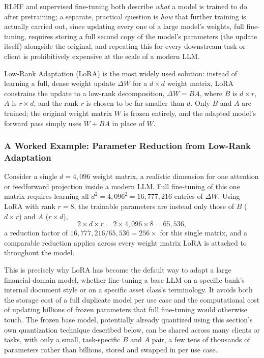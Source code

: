 \documentclass[../ai_in_finance]{subfiles}
\begin{document}
RLHF and supervised fine-tuning both describe \emph{what} a model is trained to do after pretraining; a separate, practical question is \emph{how} that further training is actually carried out, since updating every one of a large model's weights, full fine-tuning, requires storing a full second copy of the model's parameters (the update itself) alongside the original, and repeating this for every downstream task or client is prohibitively expensive at the scale of a modern LLM.

Low-Rank Adaptation (LoRA) is the most widely used solution: instead of learning a full, dense weight update $\Delta W$ for a $d\times d$ weight matrix, LoRA constrains the update to a low-rank decomposition, $\Delta W = BA$, where $B$ is $d\times r$, $A$ is $r\times d$, and the rank $r$ is chosen to be far smaller than $d$. Only $B$ and $A$ are trained; the original weight matrix $W$ is frozen entirely, and the adapted model's forward pass simply uses $W + BA$ in place of $W$.

\subsubsection*{A Worked Example: Parameter Reduction from Low-Rank Adaptation}
Consider a single $d=4{,}096$ weight matrix, a realistic dimension for one attention or feedforward projection inside a modern LLM. Full fine-tuning of this one matrix requires learning all $d^2 = 4{,}096^2 = 16{,}777{,}216$ entries of $\Delta W$. Using LoRA with rank $r=8$, the trainable parameters are instead only those of $B$ ($d \times r$) and $A$ ($r \times d$),
\begin{equation*}
2 \times d \times r = 2 \times 4{,}096 \times 8 = 65{,}536,
\end{equation*}
a reduction factor of $16{,}777{,}216 / 65{,}536 = 256\times$ for this single matrix, and a comparable reduction applies across every weight matrix LoRA is attached to throughout the model.

This is precisely why LoRA has become the default way to adapt a large financial-domain model, whether fine-tuning a base LLM on a specific bank's internal document style or on a specific asset class's terminology. It avoids both the storage cost of a full duplicate model per use case and the computational cost of updating billions of frozen parameters that full fine-tuning would otherwise touch. The frozen base model, potentially already quantized using this section's own quantization technique described below, can be shared across many clients or tasks, with only a small, task-specific $B$ and $A$ pair, a few tens of thousands of parameters rather than billions, stored and swapped in per use case.
\end{document}
